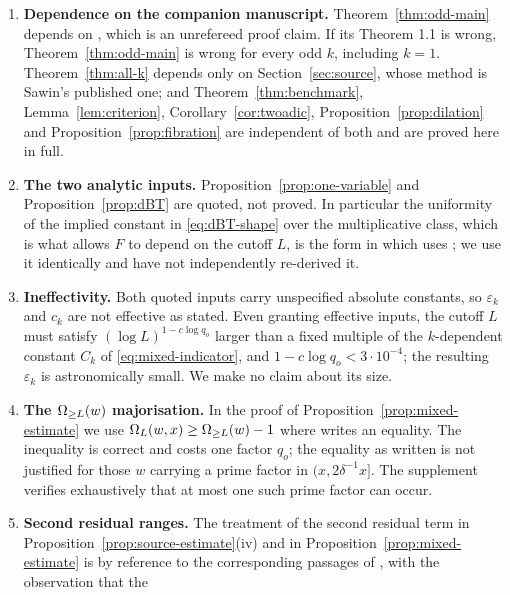 \documentclass[11pt]{article}
\begin{document}
\begin{enumerate}
\item \textbf{Dependence on the companion manuscript.} Theorem~\ref{thm:odd-main}
      depends on \cite{DellaPietra2026}, which is an unrefereed proof claim.
      If its Theorem 1.1 is wrong, Theorem~\ref{thm:odd-main} is wrong for every
      odd \(k\), including \(k=1\). Theorem~\ref{thm:all-k} depends only on
      Section~\ref{sec:source}, whose method is Sawin's published one; and
      Theorem~\ref{thm:benchmark}, Lemma~\ref{lem:criterion}, Corollary~\ref{cor:twoadic},
      Proposition~\ref{prop:dilation} and Proposition~\ref{prop:fibration} are independent of both
      and are proved here in full.
\item \textbf{The two analytic inputs.} Proposition~\ref{prop:one-variable} and
      Proposition~\ref{prop:dBT} are quoted, not proved. In particular the uniformity of
      the implied constant in \eqref{eq:dBT-shape} over the multiplicative
      class, which is what allows \(F\) to depend on the cutoff \(L\), is the
      form in which \cite{DellaPietra2026} uses
      \cite[Thm.~3.1]{BretecheTenenbaum2026}; we use it identically and have
      not independently re-derived it.
\item \textbf{Ineffectivity.} Both quoted inputs carry unspecified absolute
      constants, so \(\varepsilon_k\) and \(c_k\) are not effective as
      stated. Even granting effective inputs, the cutoff \(L\) must satisfy
      \((\log L)^{1-c\log q_o}\) larger than a fixed multiple of the
      \(k\)-dependent constant \(C_k\) of \eqref{eq:mixed-indicator}, and
      \(1-c\log q_o<3\cdot10^{-4}\); the resulting \(\varepsilon_k\) is
      astronomically small. We make no claim about its size.
\item \textbf{The \(\Omega_{\geq L}(w)\) majorisation.} In the proof of
      Proposition~\ref{prop:mixed-estimate} we use
      \(\Omega_L(w,x)\geq\Omega_{\geq L}(w)-1\) where
      \cite[Prop.~5.2]{DellaPietra2026} writes an equality. The inequality is
      correct and costs one factor \(q_o\); the equality as written is not
      justified for those \(w\) carrying a prime factor in \((x,2\delta^{-1}x]\).
      The supplement verifies exhaustively that at most one such prime factor
      can occur.
\item \textbf{Second residual ranges.} The treatment of the second residual
      term in Proposition~\ref{prop:source-estimate}(iv) and in
      Proposition~\ref{prop:mixed-estimate} is by reference to the corresponding
      passages of \cite{DellaPietra2026}, with the observation that the

\end{enumerate}
\end{document}
